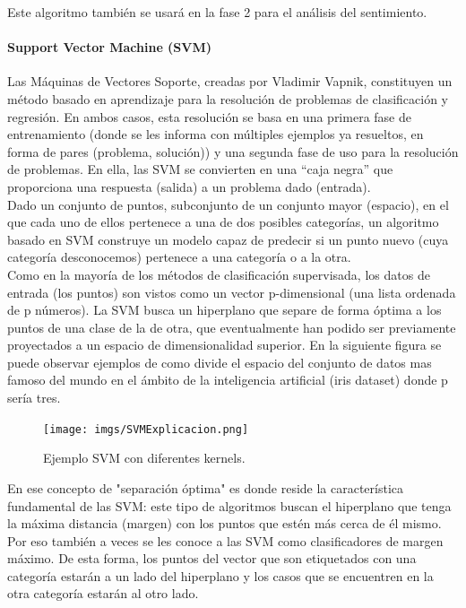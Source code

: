 \documentclass[../all.tex]{subfiles}
\begin{document}
        	Este algoritmo también se usará en la fase 2 para el análisis del sentimiento.
            
        \newpage
	    \paragraph{Support Vector Machine (SVM)}
	    
		    Las Máquinas de Vectores Soporte, creadas por Vladimir Vapnik, constituyen un método basado en aprendizaje para la resolución de problemas de clasificación y regresión. En ambos casos, esta resolución se basa en una primera fase de entrenamiento (donde se les informa con múltiples ejemplos ya resueltos, en forma de pares (problema, solución)) y una segunda fase de uso para la resolución de problemas. En ella, las SVM se convierten en una “caja negra” que proporciona una respuesta (salida) a un problema dado (entrada)\cite{svmexplicacion}.\\
		    
		    Dado un conjunto de puntos, subconjunto de un conjunto mayor (espacio), en el que cada uno de ellos pertenece a una de dos posibles categorías, un algoritmo basado en SVM construye un modelo capaz de predecir si un punto nuevo (cuya categoría desconocemos) pertenece a una categoría o a la otra.\\
		    
		    Como en la mayoría de los métodos de clasificación supervisada, los datos de entrada (los puntos) son vistos como un vector p-dimensional (una lista ordenada de p números). La SVM busca un hiperplano que separe de forma óptima a los puntos de una clase de la de otra, que eventualmente han podido ser previamente proyectados a un espacio de dimensionalidad superior. En la siguiente figura se puede observar ejemplos de como divide el espacio del conjunto de datos mas famoso del mundo en el ámbito de la inteligencia artificial (iris dataset) donde p sería tres. \\
		    
		    \begin{figure}[H]
		    	\centering
		    	\texttt{[image: imgs/SVMExplicacion.png]}
		    	\caption{Ejemplo SVM\cite{svmexplicacion} con diferentes kernels.}
		    \end{figure}
		    
		    En ese concepto de "separación óptima" es donde reside la característica fundamental de las SVM: este tipo de algoritmos buscan el hiperplano que tenga la máxima distancia (margen) con los puntos que estén más cerca de él mismo. Por eso también a veces se les conoce a las SVM como clasificadores de margen máximo. De esta forma, los puntos del vector que son etiquetados con una categoría estarán a un lado del hiperplano y los casos que se encuentren en la otra categoría estarán al otro lado.
        
\end{document}
